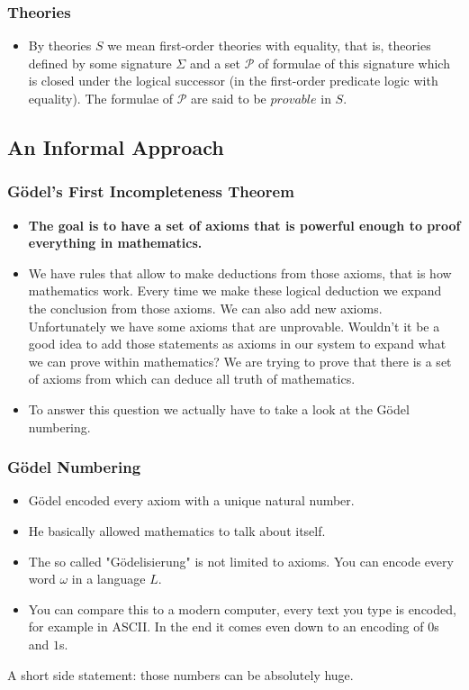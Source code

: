 \documentclass[aspectratio=169]{beamer}
\begin{document}
\begin{frame}
	\frametitle{Theories}
	\begin{itemize}
		\item By theories $S$ we mean first-order theories with equality, that is, theories defined by some signature $\Sigma$ and a set $\mathscr{P}$ of formulae of this signature which is closed under the logical successor (in the first-order predicate logic with equality). The formulae of $\mathscr{P}$ are said to be $provable$ in $S$.
	\end{itemize}
\begin{flushright}
	\cite{bekl}
\end{flushright}
\end{frame}

\begin{frame}
\subsection{An Informal Approach}
	\frametitle{Gödel's First Incompleteness Theorem}
	\begin{itemize}
		\item \textbf{The goal is to have a set of axioms that is powerful enough to proof everything in mathematics.}
		\item We have rules that allow to make deductions from those axioms, that is how mathematics work. Every time we make these logical deduction we expand the conclusion from those axioms. We can also add new axioms. Unfortunately we have some axioms that are unprovable. Wouldn't it be a good idea to add those statements as axioms in our system to expand what we can prove within mathematics? We are trying to prove that there is a set of axioms from which can deduce all truth of mathematics. 
		\item To answer this question we actually have to take a look at the Gödel numbering.
	\end{itemize}
\end{frame}
\begin{frame}
	\frametitle{Gödel Numbering}
	\begin{itemize}
		\item Gödel encoded every axiom with a unique natural number.
		\item He basically allowed mathematics to talk about itself.
		\item The so called "Gödelisierung" is not limited to axioms. You can encode every word $\omega$ in a language $L$.
		\item You can compare this to a modern computer, every text you type is encoded, for example in ASCII. In the end it comes even down to an encoding of $0$s and $1$s.
	\end{itemize}
	A short side statement: those numbers can be absolutely huge.
\end{frame}
\end{document}
